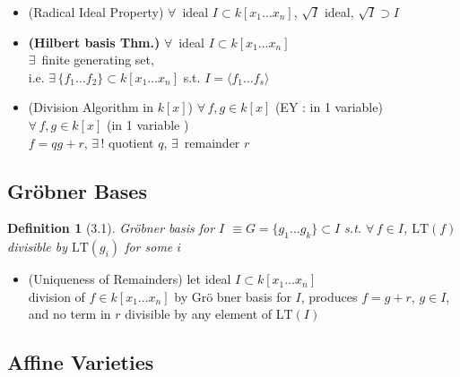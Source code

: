 \documentclass[10pt]{amsart}
\newtheorem{definition}{Definition}
\begin{document}
\begin{multicols*}{2}


\begin{itemize}
\item (Radical Ideal Property) $\forall \, $ ideal $I\subset k[x_1 \dots x_n]$, $\sqrt{I}$ ideal, $\sqrt{I} \supset I$
\item \textbf{(Hilbert basis Thm.)} $\forall \, $ ideal $I\subset k[x_1\dots x_n]$ \\
$\exists \, $ finite generating set, \\
i.e. $\exists \, \lbrace f_1 \dots f_2 \rbrace \subset k [x_1 \dots x_n]$ s.t. $I=\langle f_1 \dots f_s \rangle$
\item (Division Algorithm in $k[x]$) $\forall \, f,g \in  k[x]$ (EY : in 1 variable) \\
$\forall \, f, g \in k[x]$ (in 1 variable )\\
$f= qg + r$, $\exists \, !$ quotient $q$, $\exists \, $ remainder $r$
\end{itemize}

\subsection{}

\subsection{Gr\"obner Bases}

\begin{definition}[3.1]
  Gr\"obner basis for $I$ $\equiv G = \lbrace g_1 \dots g_k \rbrace \subset I$ s.t. $\forall \, f \in I$, $\text{LT}(f)$ divisible by $\text{LT}(g_i)$ for some $i$
\end{definition}

\begin{itemize}
\item (Uniqueness of Remainders) let ideal $I\subset k[x_1 \dots x_n]$ \\
division of $f\in k[x_1 \dots x_n]$ by Gr\"o bner basis for $I$, produces $f=g+r$, $g\in I$, and no term in $r$ divisible by any element of $\text{LT}(I)$
\end{itemize}





\subsection{Affine Varieties}


\end{multicols*}
\end{document}
